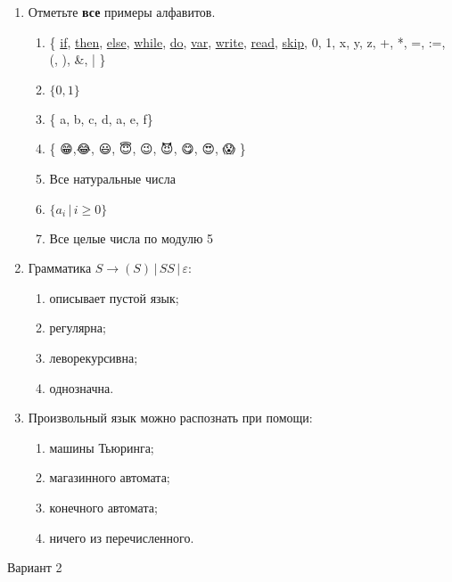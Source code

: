 \documentclass[12pt]{article}
\begin{document}
\begin{enumerate}
    \item Отметьте \textbf{все} примеры алфавитов.
    \begin{enumerate}
        \item \{ \underline{if}, \underline{then}, \underline{else}, \underline{while}, \underline{do}, \underline{var}, \underline{write}, \underline{read}, \underline{skip}, 0, 1, x, y, z, +, *, =, :=, (, ), \&, | \}
        \item $\{ 0, 1 \}$
        \item \{ a, b, c, d, a, e, f\}
        \item  \{ 😁,😂, 😃, 😇, 😉, 😈, 😋, 😍, 😱 \}
        \item Все натуральные числа
        \item $\{ a_i \, | \, i \geq 0 \}$
        \item Все целые числа по модулю 5
    \end{enumerate}
    
    \item Грамматика $S \rightarrow ( S ) \, | \, S S \, | \, \varepsilon $:
    \begin{enumerate}
        \item описывает пустой язык; 
        \item регулярна;
        \item леворекурсивна;
        \item однозначна.
    \end{enumerate}


    \item Произвольный язык можно распознать при помощи: 
    \begin{enumerate}
        \item машины Тьюринга;
        \item магазинного автомата;
        \item конечного автомата;
        \item ничего из перечисленного.
    \end{enumerate}
\end{enumerate}

\pagebreak

\medskip
{\Large Вариант 2}
\medskip
\end{document}
